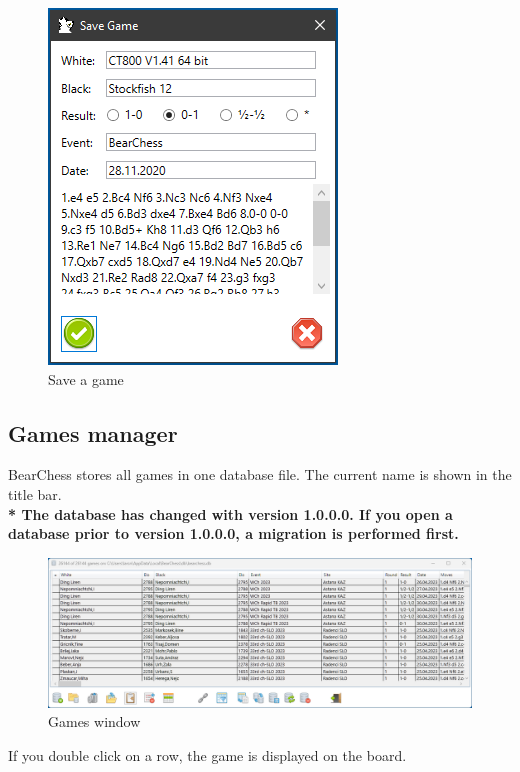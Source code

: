 \documentclass[11pt,a4paper]{article}
\begin{document}
\begin{figure}[H]
	\centering
	\includegraphics[scale=1.0]{Games2.png}
	\caption{Save a game}
	\label{fig:Games2}
\end{figure}


\subsection{Games manager}

BearChess stores all games in one database file. The current name is shown in the title bar.\\
\textbf{ {\color{red}*} The database has changed with version 1.0.0.0. If you open a database prior to version 1.0.0.0, a migration is performed first.}

\begin{figure}[H]
	\centering
	\includegraphics[scale=0.6]{Games6.png}
	\caption{Games window}
	\label{fig:Games6}
\end{figure}

If you double click on a row, the game is displayed on the board.
\end{document}
